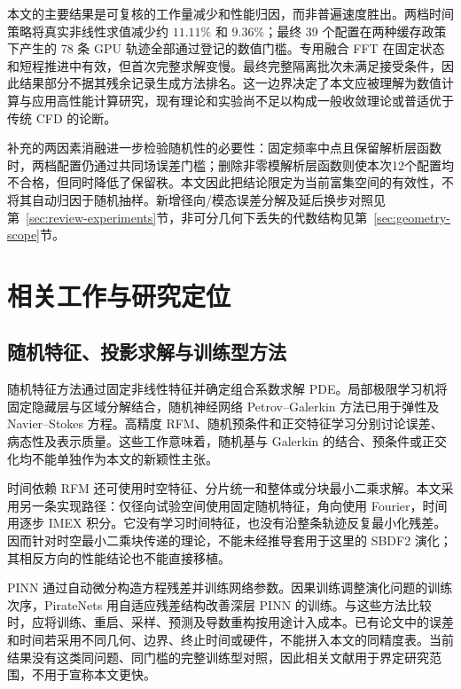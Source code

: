 本文的主要结果是可复核的工作量减少和性能归因，而非普遍速度胜出。两档时间策略将真实非线性求值减少约 \(11.11\%\) 和 \(9.36\%\)；最终 39 个配置在两种缓存政策下产生的 78 条 GPU 轨迹全部通过登记的数值门槛。专用融合 FFT 在固定状态和短程推进中有效，但首次完整求解变慢。最终完整隔离批次未满足接受条件，因此结果部分不据其残余记录生成方法排名。这一边界决定了本文应被理解为数值计算与应用高性能计算研究，现有理论和实验尚不足以构成一般收敛理论或普适优于传统 CFD 的论断。

补充的两因素消融进一步检验随机性的必要性：固定频率中点且保留解析层函数时，两档配置仍通过共同场误差门槛；删除非零模解析层函数则使本次12个配置均不合格，但同时降低了保留秩。本文因此把结论限定为当前富集空间的有效性，不将其自动归因于随机抽样。新增径向/模态误差分解及延后换步对照见第~\ref{sec:review-experiments}节，非可分几何下丢失的代数结构见第~\ref{sec:geometry-scope}节。

\section{相关工作与研究定位}
\label{sec:related-work}

\subsection{随机特征、投影求解与训练型方法}

随机特征方法通过固定非线性特征并确定组合系数求解 PDE\cite{r1}。局部极限学习机将固定隐藏层与区域分解结合\cite{r2}，随机神经网络 Petrov--Galerkin 方法已用于弹性及 Navier--Stokes 方程\cite{r3}。高精度 RFM、随机预条件和正交特征学习分别讨论误差、病态性及表示质量\cite{r4,r5,r6}。这些工作意味着，随机基与 Galerkin 的结合、预条件或正交化均不能单独作为本文的新颖性主张。

时间依赖 RFM 还可使用时空特征、分片统一和整体或分块最小二乘求解\cite{r15}。本文采用另一条实现路径：仅径向试验空间使用固定随机特征，角向使用 Fourier，时间用逐步 IMEX 积分。它没有学习时间特征，也没有沿整条轨迹反复最小化残差。因而针对时空最小二乘块传递的理论，不能未经推导套用于这里的 SBDF2 演化；其相反方向的性能结论也不能直接移植。

PINN 通过自动微分构造方程残差并训练网络参数\cite{r7}。因果训练调整演化问题的训练次序，PirateNets 用自适应残差结构改善深层 PINN 的训练\cite{r8,r16}。与这些方法比较时，应将训练、重启、采样、预测及导数重构按用途计入成本。已有论文中的误差和时间若采用不同几何、边界、终止时间或硬件，不能拼入本文的同精度表。当前结果没有这类同问题、同门槛的完整训练型对照，因此相关文献用于界定研究范围，不用于宣称本文更快。

